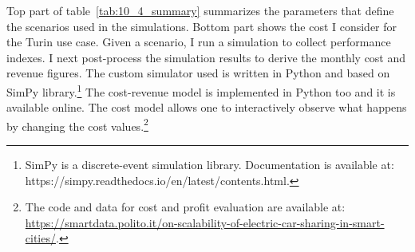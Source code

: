 Top part of table~\ref{tab:10_4_summary} summarizes the parameters that define the scenarios used in the simulations. Bottom part shows the cost I consider for the Turin use case.
Given a scenario, I run a simulation to collect performance indexes. I next post-process the simulation results to derive the monthly cost and revenue figures. The custom simulator used is written in Python and based on SimPy library.\footnote{SimPy is a discrete-event simulation library. Documentation is available at: https://simpy.readthedocs.io/en/latest/contents.html.} The cost-revenue model is implemented in Python too and it is available online. The cost model allows one to interactively observe what happens by changing the cost values.\footnote{The code and data for cost and profit evaluation are available at: \url{https://smartdata.polito.it/on-scalability-of-electric-car-sharing-in-smart-cities/}.}

